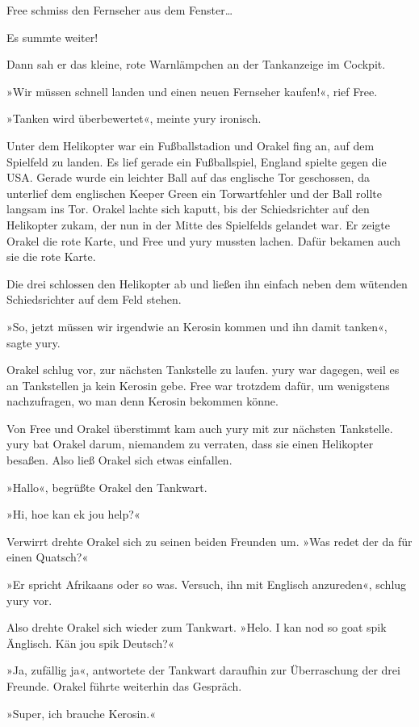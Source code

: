 Free schmiss den Fernseher aus dem Fenster…

Es summte weiter!

Dann sah er das kleine, rote Warnlämpchen an der Tankanzeige im Cockpit.

»Wir müssen schnell landen und einen neuen Fernseher kaufen!«, rief Free.

»Tanken wird überbewertet«, meinte yury ironisch.

Unter dem Helikopter war ein Fußballstadion und Orakel fing an, auf dem Spielfeld zu landen. Es lief gerade ein Fußballspiel, England spielte gegen die USA. Gerade wurde ein leichter Ball auf das englische Tor geschossen, da unterlief dem englischen Keeper Green ein Torwartfehler und der Ball rollte langsam ins Tor. Orakel lachte sich kaputt, bis der Schiedsrichter auf den Helikopter zukam, der nun in der Mitte des Spielfelds gelandet war. Er zeigte Orakel die rote Karte, und Free und yury mussten lachen. Dafür bekamen auch sie die rote Karte.

Die drei schlossen den Helikopter ab und ließen ihn einfach neben dem wütenden Schiedsrichter auf dem Feld stehen.

»So, jetzt müssen wir irgendwie an Kerosin kommen und ihn damit tanken«, sagte yury.

Orakel schlug vor, zur nächsten Tankstelle zu laufen. yury war dagegen, weil es an Tankstellen ja kein Kerosin gebe. Free war trotzdem dafür, um wenigstens nachzufragen, wo man denn Kerosin bekommen könne.

Von Free und Orakel überstimmt kam auch yury mit zur nächsten Tankstelle. yury bat Orakel darum, niemandem zu verraten, dass sie einen Helikopter besaßen. Also ließ Orakel sich etwas einfallen.

»Hallo«, begrüßte Orakel den Tankwart.

»Hi, hoe kan ek jou help?«

Verwirrt drehte Orakel sich zu seinen beiden Freunden um. »Was redet der da für einen Quatsch?«

»Er spricht Afrikaans oder so was. Versuch, ihn mit Englisch anzureden«, schlug yury vor.

Also drehte Orakel sich wieder zum Tankwart. »Helo. I kan nod so goat spik Änglisch. Kän jou spik Deutsch?«

»Ja, zufällig ja«, antwortete der Tankwart daraufhin zur Überraschung der drei Freunde. Orakel führte weiterhin das Gespräch.

»Super, ich brauche Kerosin.«

